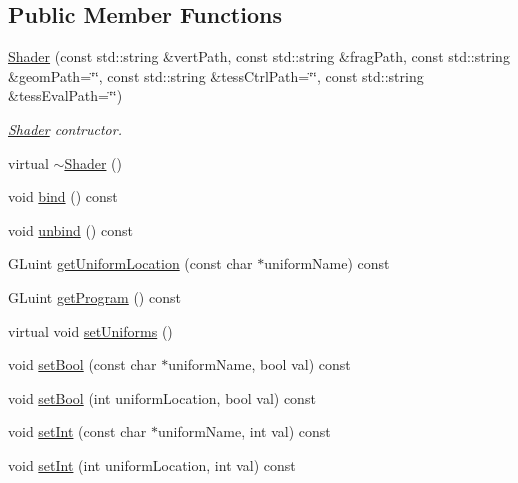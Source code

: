 \subsection*{Public Member Functions}
\begin{DoxyCompactItemize}
\item 
\mbox{\hyperlink{classec_1_1_shader_a3a564a98ae49d2c050dc2221d56d54ca}{Shader}} (const std\+::string \&vert\+Path, const std\+::string \&frag\+Path, const std\+::string \&geom\+Path=\char`\"{}\char`\"{}, const std\+::string \&tess\+Ctrl\+Path=\char`\"{}\char`\"{}, const std\+::string \&tess\+Eval\+Path=\char`\"{}\char`\"{})
\begin{DoxyCompactList}\small\item\em \mbox{\hyperlink{classec_1_1_shader}{Shader}} contructor. \end{DoxyCompactList}\item 
virtual \mbox{\hyperlink{classec_1_1_shader_ac448e8be5b0b2030a6d71ac5725d9157}{$\sim$\+Shader}} ()
\item 
void \mbox{\hyperlink{classec_1_1_shader_aa845ca62b0ccfbe7a07440fdf7641147}{bind}} () const
\item 
void \mbox{\hyperlink{classec_1_1_shader_a4d3730787deb6b28d59fc8b6486e5cb3}{unbind}} () const
\item 
G\+Luint \mbox{\hyperlink{classec_1_1_shader_a90fc22094d5f262c31e03066b71a88e1}{get\+Uniform\+Location}} (const char $\ast$uniform\+Name) const
\item 
G\+Luint \mbox{\hyperlink{classec_1_1_shader_a54164ed1a5d74d390f70bcfa59aa8799}{get\+Program}} () const
\item 
virtual void \mbox{\hyperlink{classec_1_1_shader_a2d674dadf35f9fba8d3ec75d0a916935}{set\+Uniforms}} ()
\end{DoxyCompactItemize}
\textbf{ }\par
\begin{DoxyCompactItemize}
\item 
void \mbox{\hyperlink{classec_1_1_shader_a0705647decc2663477c0abad943490bc}{set\+Bool}} (const char $\ast$uniform\+Name, bool val) const
\item 
void \mbox{\hyperlink{classec_1_1_shader_acb2a56cad426e5c7e51b6912dcfbeefd}{set\+Bool}} (int uniform\+Location, bool val) const
\end{DoxyCompactItemize}

\textbf{ }\par
\begin{DoxyCompactItemize}
\item 
void \mbox{\hyperlink{classec_1_1_shader_af9d30a0d4f1b2e469fe41a232ebf0614}{set\+Int}} (const char $\ast$uniform\+Name, int val) const
\item 
void \mbox{\hyperlink{classec_1_1_shader_a4fa159ab084304c3e5549602d3e37bff}{set\+Int}} (int uniform\+Location, int val) const
\end{DoxyCompactItemize}

